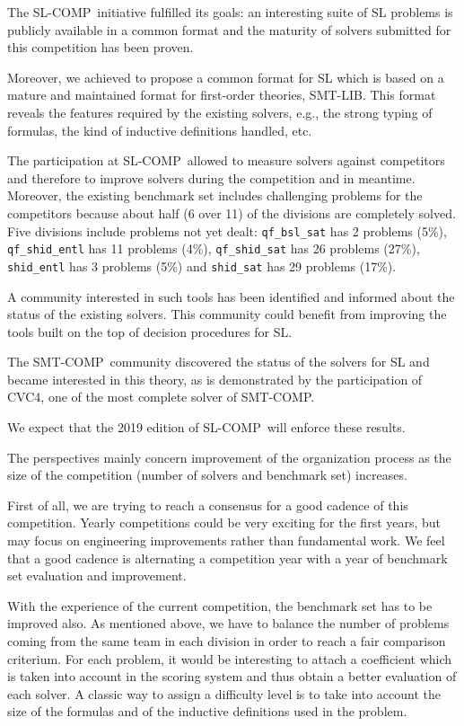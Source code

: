 \documentclass[orivec]{llncs}
\newcommand{\smtlib}{\textsf{SMT-LIB}}
\newcommand{\smtcomp}{\textsf{SMT-COMP}}
\newcommand{\slcomp}{\textsf{SL-COMP}}
\begin{document}
The \slcomp\ initiative fulfilled its goals:
an interesting suite of SL problems is publicly available in a common format and
the maturity of solvers submitted for this competition has been proven.

Moreover, we achieved to propose a common format for SL which 
is based on a mature and maintained format for first-order theories, \smtlib. 
This format reveals the features required by the existing solvers, e.g., the strong typing of formulas, the kind of inductive definitions handled, etc.

The participation at \slcomp\ allowed to measure solvers against competitors and
therefore to improve solvers during the competition and in meantime.
Moreover, the existing benchmark set includes challenging problems for the
competitors because about half (6 over 11) of the divisions are completely solved.
Five divisions include problems not yet dealt:  
\verb|qf_bsl_sat| has 2 problems (5\%),
\verb|qf_shid_entl| has 11 problems (4\%),
\verb|qf_shid_sat| has 26 problems (27\%),
\verb|shid_entl| has 3 problems (5\%) and
\verb|shid_sat| has 29 problems (17\%). 

A community interested in such tools has been identified and informed about the status of the existing solvers.
This community could benefit from improving the tools built on the top of decision procedures for SL.

The \smtcomp\ community discovered the status of the solvers for SL and became interested in this theory, as is demonstrated by the participation of CVC4, one of the most complete solver of \smtcomp.


We expect that the 2019 edition of \slcomp\ will enforce these results.

The perspectives mainly concern improvement of the organization process as the size of the competition (number of solvers and benchmark set) increases.

First of all, we are trying to reach a consensus for a good cadence of this competition. Yearly competitions could be very exciting for the first years, but may focus on engineering improvements rather than fundamental work. 
We feel that a good cadence is alternating a competition year with a year of benchmark set evaluation and improvement.

With the experience of the current competition, the benchmark set has to be improved also. 
As mentioned above, we have to balance the number of problems coming from the same team in each division in order to reach a fair comparison criterium.
For each problem, it would be interesting to attach a coefficient which is taken into
account in the scoring system and thus obtain a better evaluation of each solver.
A classic way to assign a difficulty level is to take into account the size of the formulas and of the inductive definitions used in the problem. 
\end{document}
